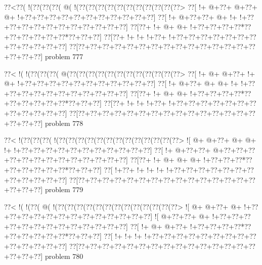 \vbox{\vbox{\goo
\0??<\0??(\- !(\0??(\0??(\0??(\- @(\- !(\0??(\0??(\0??(\0??(\0??(\0??(\0??(\0??(\0??(\0??(\0??>
\0??[\- !+\- @+\0??+\- @+\0??+\- @+\- !+\0??+\0??+\0??+\0??+\0??+\0??+\0??+\0??+\0??+\0??+\0??]
\0??[\- !+\- @+\0??+\0??+\- @+\- !+\- !+\0??+\0??+\0??+\0??+\0??+\0??+\0??+\0??+\0??+\0??+\0??]
\0??[\0??+\- !+\- @+\- @+\- !+\0??+\0??+\0??+\0??*\0??+\0??+\0??+\0??+\0??+\0??*\0??+\0??+\0??]
\0??[\0??+\- !+\- !+\- !+\0??+\- !+\0??+\0??+\0??+\0??+\0??+\0??+\0??+\0??+\0??+\0??+\0??+\0??]
\0??[\0??+\0??+\0??+\0??+\0??+\0??+\0??+\0??+\0??+\0??+\0??+\0??+\0??+\0??+\0??+\0??+\0??+\0??]
}
\hfil problem 777\hfil\break
}



\vbox{\vbox{\goo
\0??<\- !(\- !(\0??(\0??(\0??(\- @(\0??(\0??(\0??(\0??(\0??(\0??(\0??(\0??(\0??(\0??(\0??(\0??>
\0??[\- !+\- @+\- @+\0??+\- !+\- @+\- !+\0??+\0??+\0??+\0??+\0??+\0??+\0??+\0??+\0??+\0??+\0??]
\0??[\- !+\- @+\0??+\- @+\- @+\- !+\- !+\0??+\0??+\0??+\0??+\0??+\0??+\0??+\0??+\0??+\0??+\0??]
\0??[\0??+\- !+\- @+\- @+\- !+\0??+\0??+\0??+\0??*\0??+\0??+\0??+\0??+\0??+\0??*\0??+\0??+\0??]
\0??[\0??+\- !+\- !+\- !+\0??+\- !+\0??+\0??+\0??+\0??+\0??+\0??+\0??+\0??+\0??+\0??+\0??+\0??]
\0??[\0??+\0??+\0??+\0??+\0??+\0??+\0??+\0??+\0??+\0??+\0??+\0??+\0??+\0??+\0??+\0??+\0??+\0??]
}
\hfil problem 778\hfil\break
}



\vbox{\vbox{\goo
\0??<\- !(\0??(\0??(\0??(\- !(\0??(\0??(\0??(\0??(\0??(\0??(\0??(\0??(\0??(\0??(\0??(\0??(\0??>
\- ![\- @+\- @+\0??+\- @+\- @+\- !+\- !+\0??+\0??+\0??+\0??+\0??+\0??+\0??+\0??+\0??+\0??+\0??]
\0??[\- !+\- @+\0??+\0??+\- @+\0??+\0??+\0??+\0??+\0??+\0??+\0??+\0??+\0??+\0??+\0??+\0??+\0??]
\0??[\0??+\- !+\- @+\- @+\- @+\- !+\0??+\0??+\0??*\0??+\0??+\0??+\0??+\0??+\0??*\0??+\0??+\0??]
\0??[\- !+\0??+\- !+\- !+\- !+\- !+\0??+\0??+\0??+\0??+\0??+\0??+\0??+\0??+\0??+\0??+\0??+\0??]
\0??[\0??+\0??+\0??+\0??+\0??+\0??+\0??+\0??+\0??+\0??+\0??+\0??+\0??+\0??+\0??+\0??+\0??+\0??]
}
\hfil problem 779\hfil\break
}



\vbox{\vbox{\goo
\0??<\- !(\- !(\0??(\- @(\- !(\0??(\0??(\0??(\0??(\0??(\0??(\0??(\0??(\0??(\0??(\0??(\0??(\0??>
\- ![\- @+\- @+\0??+\- @+\- !+\0??+\0??+\0??+\0??+\0??+\0??+\0??+\0??+\0??+\0??+\0??+\0??+\0??]
\- ![\- @+\0??+\0??+\- @+\- !+\0??+\0??+\0??+\0??+\0??+\0??+\0??+\0??+\0??+\0??+\0??+\0??+\0??]
\0??[\- !+\- @+\- @+\0??+\- !+\0??+\0??+\0??+\0??*\0??+\0??+\0??+\0??+\0??+\0??*\0??+\0??+\0??]
\0??[\- !+\- !+\- !+\- !+\0??+\0??+\0??+\0??+\0??+\0??+\0??+\0??+\0??+\0??+\0??+\0??+\0??+\0??]
\0??[\0??+\0??+\0??+\0??+\0??+\0??+\0??+\0??+\0??+\0??+\0??+\0??+\0??+\0??+\0??+\0??+\0??+\0??]
}
\hfil problem 780\hfil\break
}



